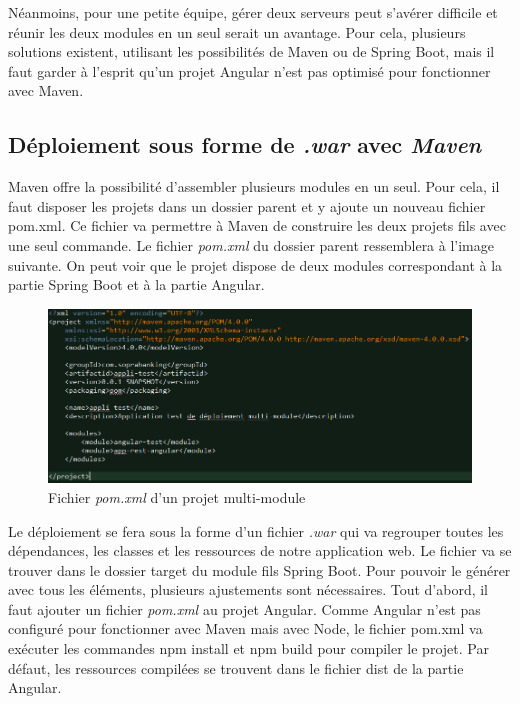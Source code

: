 \documentclass{polytech/polytech}
\begin{document}
Néanmoins, pour une petite équipe, gérer deux serveurs peut s’avérer difficile et réunir les deux modules en un seul serait un avantage. Pour cela, plusieurs solutions existent, utilisant les possibilités de Maven ou de Spring Boot, mais il faut garder à l’esprit qu’un projet Angular n’est pas optimisé pour fonctionner avec Maven. 

\subsection{Déploiement sous forme de \textit{.war} avec \textit{Maven}}

Maven offre la possibilité d’assembler plusieurs modules en un seul. Pour cela, il faut disposer les projets dans un dossier parent et y ajoute un nouveau fichier pom.xml. Ce fichier va permettre à Maven de construire les deux projets fils avec une seul commande. Le fichier \textit{pom.xml} du dossier parent ressemblera à l’image suivante. On peut voir que le projet dispose de deux modules correspondant à la partie Spring Boot et à la partie Angular. 


\begin{figure}
	\includegraphics[scale=0.6]{images/pomParent}
	\caption{Fichier \textit{pom.xml} d'un projet multi-module}
	\label{fig:pomMultiApp}
\end{figure}

Le déploiement se fera sous la forme d’un fichier \textit{.war} qui va regrouper toutes les dépendances, les classes et les ressources de notre application web. Le fichier va se trouver dans le dossier target du module fils Spring Boot. Pour pouvoir le générer avec tous les éléments, plusieurs ajustements sont nécessaires. Tout d’abord, il faut ajouter un fichier \textit{pom.xml} au projet Angular. Comme Angular n’est pas configuré pour fonctionner avec Maven mais avec Node, le fichier pom.xml va exécuter les commandes npm install et npm build pour compiler le projet. Par défaut, les ressources compilées se trouvent dans le fichier dist de la partie Angular. 
\end{document}
